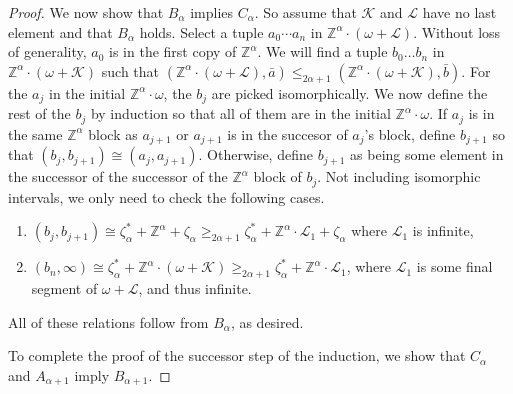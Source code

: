 \documentclass[10pt,a4paper]{amsart}
\providecommand{\L}{\mathcal{L}}
\providecommand{\ba}{\bar a}
\providecommand{\bb}{\bar b}
\newcommand{\Z}{\mathbb{Z}}
\newcommand{\K}{\mathcal{K}}
\renewcommand{\L}{\mathcal{L}}
\begin{document}
\begin{proof}
We now show that $B_\alpha$ implies $C_\alpha$. So assume that $\K$ and $\L$ have
no last element and that $B_\alpha$ holds. 
Select a tuple $a_0\cdots  a_n$ in $\Z^\alpha\cdot(\omega+\L)$.
Without loss of generality, $a_0$ is in the first copy of $\Z^\alpha$. We will
find a tuple $b_0\dots b_n$ in $\Z^\alpha\cdot(\omega+\K)$ such that
$(\Z^\alpha\cdot (\omega+\L),\ba)\leq_{2\alpha+1}
(\Z^\alpha\cdot(\omega+\K),\bb)$. For the $a_j$ in the initial $\Z^\alpha\cdot\omega$, the $b_j$ are picked isomorphically. 
We now define the rest of the $b_j$ by induction so that all of them are in the initial $\Z^\alpha\cdot\omega$.
If $a_j$ is in the same $\Z^\alpha$ block as $a_{j+1}$ or $a_{j+1}$ is in the
succesor of $a_j$'s block, define $b_{j+1}$ so that
$(b_j,b_{j+1})\cong (a_j,a_{j+1})$.
Otherwise, define $b_{j+1}$ as being some element in the successor of the
successor of the $\Z^\alpha$ block of $b_j$. 
Not including isomorphic intervals, we only need to check the following cases. 
\begin{enumerate}
    \item $(b_j,b_{j+1})\cong\zeta^*_\alpha +\Z^\alpha+\zeta_\alpha \geq_{2\alpha+1} \zeta^*_\alpha
    +\Z^\alpha\cdot \L_1+\zeta_\alpha$ where $\L_1$ is infinite, 
\item $(b_n,\infty)\cong\zeta^*_\alpha +\Z^\alpha\cdot (\omega+\K) \geq_{2\alpha+1}
    \zeta^*_\alpha +\Z^\alpha\cdot \L_1$, where $\L_1$ is some final segment of
    $\omega+\L$, and thus infinite.
\end{enumerate} 
All of these relations follow from $B_\alpha$, as desired.

To complete the proof of the successor step of the induction, we show that
$C_\alpha$ and $A_{\alpha+1}$ imply $B_{\alpha+1}$.


\end{proof}
\end{document}
